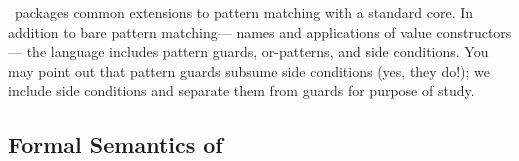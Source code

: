 \documentclass[article,screen,12pt, nonacm]{acmart}
\begin{document}
    \PPlus\ packages common extensions to pattern matching with a standard core.
    In addition to bare pattern matching— names and applications of value
    constructors— the language includes pattern guards, or-patterns, and side
    conditions. You may point out that pattern guards subsume side conditions
    (yes, they do!); we include side conditions and separate them from guards
    for purpose of study. 
    

\subsection{Formal Semantics of \PPlus}

\end{document}
